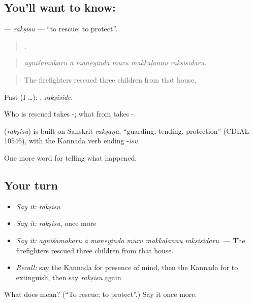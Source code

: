 \subsection*{You'll want to know: }
\textbf{} — \emph{rakṣisu} — \textquotedblleft{}to rescue; to protect\textquotedblright{}.

\begin{quote}
     .
\end{quote}

\begin{quote}
\emph{agniśāmakaru ā maneyinda mūru makkaḷannu rakṣisidaru.}
\end{quote}

\begin{quote}
The firefighters rescued three children from that house.
\end{quote}

Past (I …): , \emph{rakṣiside}.

Who is rescued takes -; what from takes -.

\begin{cousinweb}
\textbf{} (\emph{rakṣisu}) is built on Sanskrit \emph{rakṣaṇa}, \textquotedblleft{}guarding, tending, protection\textquotedblright{} (CDIAL 10546), with the Kannada verb ending -\emph{isu}.
\end{cousinweb}

\begin{grammarlens}[title={What you've built}]
One more word for telling what happened.
\end{grammarlens}

\subsection*{Your turn}
\begin{itemize}
\raggedright
  \item \emph{Say it:} \emph{rakṣisu}
  \item \emph{Say it:} \emph{rakṣisu}, once more
  \item \emph{Say it:} \emph{agniśāmakaru ā maneyinda mūru makkaḷannu rakṣisidaru.} — The firefighters rescued three children from that house.
  \item \emph{Recall:} say the Kannada for presence of mind, then the Kannada for to extinguish, then say \emph{rakṣisu} again
\end{itemize}

\begin{tcolorbox}[breakable,colback=teal!4,colframe=teal!35!black,title={Before you move on}]
What does  mean? (\textquotedblleft{}To rescue; to protect\textquotedblright{}.) Say it once more.
\end{tcolorbox}

